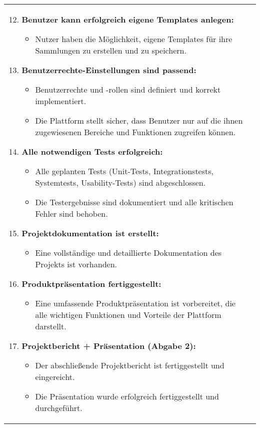 \newpage


\begin{tabularx}{\textwidth}{L R}
    \begin{enumerate}[left=0pt,label=\arabic*.]
        \setcounter{enumi}{11}
        \small
        \item \textbf{Benutzer kann erfolgreich eigene Templates anlegen:}
        \begin{itemize}[label=--]
            \item Nutzer haben die Möglichkeit, eigene Templates für ihre Sammlungen zu erstellen und zu speichern.
        \end{itemize}

        \item \textbf{Benutzerrechte-Einstellungen sind passend:}
        \begin{itemize}[label=--]
            \item Benutzerrechte und -rollen sind definiert und korrekt implementiert.
            \item Die Plattform stellt sicher, dass Benutzer nur auf die ihnen zugewiesenen Bereiche und Funktionen zugreifen können.
        \end{itemize}

        \item \textbf{Alle notwendigen Tests erfolgreich:}
        \begin{itemize}[label=--]
            \item Alle geplanten Tests (Unit-Tests, Integrationstests, Systemtests, Usability-Tests) sind abgeschlossen.
            \item Die Testergebnisse sind dokumentiert und alle kritischen Fehler sind behoben.
        \end{itemize}

        \item \textbf{Projektdokumentation ist erstellt:}
        \begin{itemize}[label=--]
            \item Eine vollständige und detaillierte Dokumentation des Projekts ist vorhanden.
        \end{itemize}

        \item \textbf{Produktpräsentation fertiggestellt:}
        \begin{itemize}[label=--]
            \item Eine umfassende Produktpräsentation ist vorbereitet, die alle wichtigen Funktionen und Vorteile der Plattform darstellt.
        \end{itemize}

        \item \textbf{Projektbericht + Präsentation (Abgabe 2):}
        \begin{itemize}[label=--]
            \item Der abschließende Projektbericht ist fertiggestellt und eingereicht.
            \item Die Präsentation wurde erfolgreich fertiggestellt und durchgeführt.
        \end{itemize}
    \end{enumerate}
    &
\end{tabularx}


